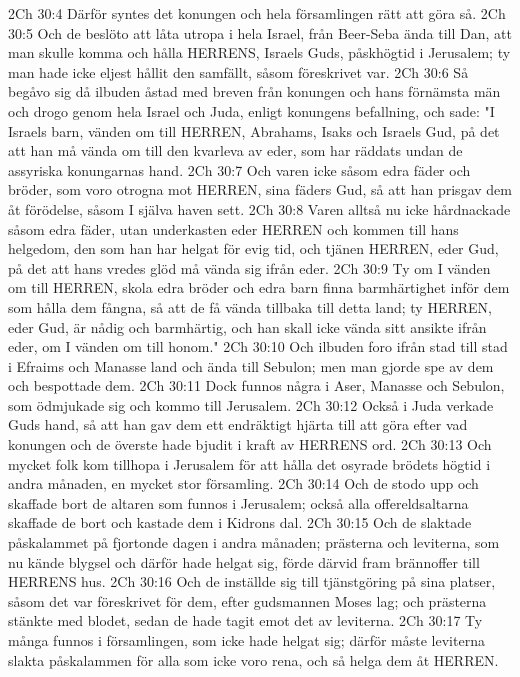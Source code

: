 2Ch 30:4  Därför syntes det konungen och hela församlingen rätt att göra så.
2Ch 30:5  Och de beslöto att låta utropa i hela Israel, från Beer-Seba ända till Dan, att man skulle komma och hålla HERRENS, Israels Guds, påskhögtid i Jerusalem; ty man hade icke eljest hållit den samfällt, såsom föreskrivet var.
2Ch 30:6  Så begåvo sig då ilbuden åstad med breven från konungen och hans förnämsta män och drogo genom hela Israel och Juda, enligt konungens befallning, och sade: "I Israels barn, vänden om till HERREN, Abrahams, Isaks och Israels Gud, på det att han må vända om till den kvarleva av eder, som har räddats undan de assyriska konungarnas hand.
2Ch 30:7  Och varen icke såsom edra fäder och bröder, som voro otrogna mot HERREN, sina fäders Gud, så att han prisgav dem åt förödelse, såsom I själva haven sett.
2Ch 30:8  Varen alltså nu icke hårdnackade såsom edra fäder, utan underkasten eder HERREN och kommen till hans helgedom, den som han har helgat för evig tid, och tjänen HERREN, eder Gud, på det att hans vredes glöd må vända sig ifrån eder.
2Ch 30:9  Ty om I vänden om till HERREN, skola edra bröder och edra barn finna barmhärtighet inför dem som hålla dem fångna, så att de få vända tillbaka till detta land; ty HERREN, eder Gud, är nådig och barmhärtig, och han skall icke vända sitt ansikte ifrån eder, om I vänden om till honom."
2Ch 30:10  Och ilbuden foro ifrån stad till stad i Efraims och Manasse land och ända till Sebulon; men man gjorde spe av dem och bespottade dem.
2Ch 30:11  Dock funnos några i Aser, Manasse och Sebulon, som ödmjukade sig och kommo till Jerusalem.
2Ch 30:12  Också i Juda verkade Guds hand, så att han gav dem ett endräktigt hjärta till att göra efter vad konungen och de överste hade bjudit i kraft av HERRENS ord.
2Ch 30:13  Och mycket folk kom tillhopa i Jerusalem för att hålla det osyrade brödets högtid i andra månaden, en mycket stor församling.
2Ch 30:14  Och de stodo upp och skaffade bort de altaren som funnos i Jerusalem; också alla offereldsaltarna skaffade de bort och kastade dem i Kidrons dal.
2Ch 30:15  Och de slaktade påskalammet på fjortonde dagen i andra månaden; prästerna och leviterna, som nu kände blygsel och därför hade helgat sig, förde därvid fram brännoffer till HERRENS hus.
2Ch 30:16  Och de inställde sig till tjänstgöring på sina platser, såsom det var föreskrivet för dem, efter gudsmannen Moses lag; och prästerna stänkte med blodet, sedan de hade tagit emot det av leviterna.
2Ch 30:17  Ty många funnos i församlingen, som icke hade helgat sig; därför måste leviterna slakta påskalammen för alla som icke voro rena, och så helga dem åt HERREN.
